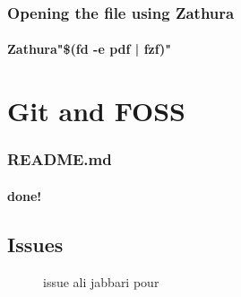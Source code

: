 \documentclass[titlepage]{article}
\begin{document}
\subsubsection{Opening the file using Zathura}
\paragraph{Zathura"\$(fd -e pdf | fzf)"}
\section{Git and FOSS}
\subsubsection{README.md}
\paragraph{done!}
\subsection{Issues}
\begin {figure}[ht]
\centering
{}
\caption{issue ali jabbari pour}
\end{figure}
\end{document}
